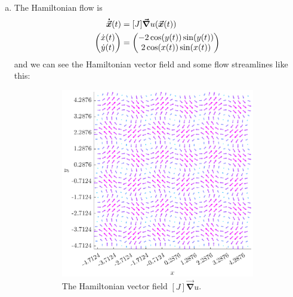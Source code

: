 \documentclass[12pt]{article} %
\newcommand{\grad}{\boldsymbol{\vec{\nabla}}}
\newcommand{\vecxdot}{\boldsymbol{\dot{\vec{x}}}}
\begin{document}
\begin{solution}
\begin{enumerate}[(a)]
\item The Hamiltonian flow is
\begin{align*}
	\vecxdot(t) &= [J]\grad u(\vecx(t))\\
	\begin{pmatrix} \dot{x}(t) \\ \dot{y}(t)\end{pmatrix} &= \begin{pmatrix} -2 \cos(y(t))\sin(y(t))\\ 2 \cos(x(t))\sin(x(t)) \end{pmatrix}
\end{align*}
and we can see the Hamiltonian vector field and some flow streamlines like this:
    \begin{figure}[H]
    	\centering
        \begin{subfigure}[b]{0.45\textwidth}
        \centering
    	\includegraphics[width=\textwidth]{figures/hamiltonian_vec_field}
        \caption{The Hamiltonian vector field $[J]\grad u$.}
        \end{subfigure}
\hfill
        \begin{subfigure}[b]{0.45\textwidth}
        	\centering

\end{subfigure}
\end{figure}
\end{enumerate}
\end{solution}
\end{document}
